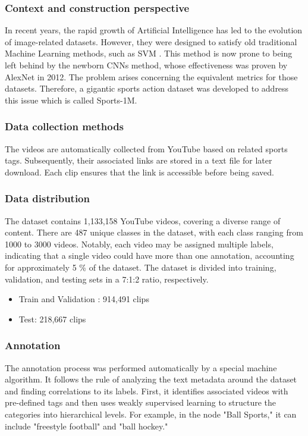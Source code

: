 \documentclass[10pt,onecolumn,letterpaper]{article}
\begin{document}
\subsubsection{\textbf{Context and construction perspective}}
In recent years, the rapid growth of Artificial Intelligence has led to the evolution of image-related datasets. However, they were designed to satisfy old traditional Machine Learning methods, such as SVM \cite{HMDB51} \cite{UCF101}. This method is now prone to being left behind by the newborn CNNs method, whose effectiveness was proven by AlexNet \cite{AlexNet} in 2012. The problem arises concerning the equivalent metrics for those datasets. Therefore, a gigantic sports action dataset was developed to address this issue which is called Sports-1M.
\subsubsection{Data collection methods}
The videos are automatically collected from YouTube based on related sports tags. Subsequently, their associated links are stored in a text file for later download. Each clip ensures that the link is accessible before being saved.
\subsubsection{Data distribution}
The dataset contains 1,133,158 YouTube videos, covering a diverse range of content. There are 487 unique classes in the dataset, with each class 
ranging from 1000 to 3000 videos. Notably, each video may be assigned multiple labels, indicating that a single video could have more than one annotation, accounting for approximately 5 \% of the dataset. The dataset is divided into training, validation, and testing sets in a 7:1:2 ratio, respectively.
\begin{itemize}
	\item Train and Validation : 914,491 clips
	\item Test: 218,667 clips
\end{itemize}
\subsubsection{Annotation}
The annotation process was performed automatically by a special machine algorithm. It follows the rule of analyzing the text metadata around the dataset and finding correlations to its labels. First, it identifies associated videos with pre-defined tags and then uses weakly supervised learning to structure the categories into hierarchical levels. For example, in the node "Ball Sports," it can include "freestyle football" and "ball hockey."
\end{document}
